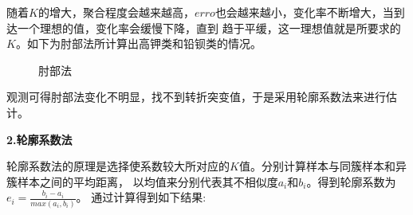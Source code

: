 \documentclass[UTF8]{ctexart}
\begin{document}
随着$K$的增大，聚合程度会越来越高，$erro$也会越来越小，变化率不断增大，当到达一个理想的值，变化率会缓慢下降，直到
趋于平缓，这一理想值就是所要求的$K$。如下为肘部法所计算出高钾类和铅钡类的情况。

\begin{figure}[htbp]
    \centering
    \caption{肘部法}
    \label{fig}
\end{figure}

观测可得肘部法变化不明显，找不到转折突变值，于是采用轮廓系数法来进行估计。

\textbf{2.轮廓系数法}

轮廓系数法的原理是选择使系数较大所对应的$K$值。分别计算样本与同簇样本和异簇样本之间的平均距离，
以均值来分别代表其不相似度$a_i$和$b_i$。得到轮廓系数为$e_i = \frac{b_i-a_i}{max(a_i,b_i)}$。
通过计算得到如下结果:
\end{document}
